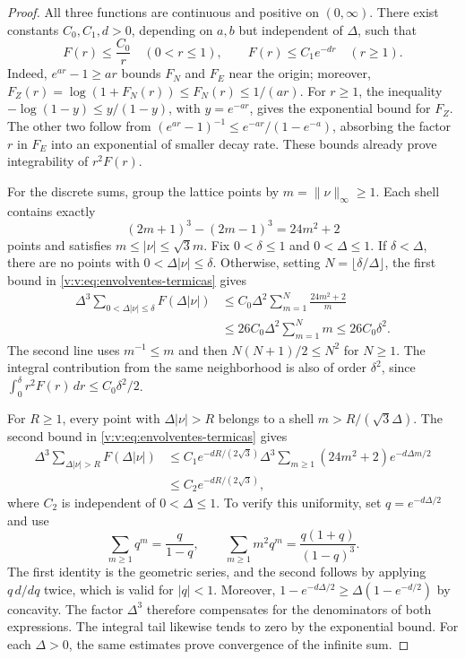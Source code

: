 \begin{proof}
All three functions are continuous and positive on \((0,\infty)\).
There exist constants \(C_0,C_1,d>0\), depending on \(a,b\) but
independent of \(\Delta\), such that
\begin{equation}
 F(r)\leq\frac{C_0}{r}\quad(0<r\leq1),\qquad
 F(r)\leq C_1e^{-dr}\quad(r\geq1).
 \label{v:v:eq:envolventes-termicas}
\end{equation}
Indeed, \(e^{ar}-1\geq ar\) bounds \(F_N\) and \(F_E\)
near the origin; moreover,
\(F_Z(r)=\log(1+F_N(r))\leq F_N(r)\leq1/(ar)\).
For \(r\geq1\), the inequality
\(-\log(1-y)\leq y/(1-y)\), with \(y=e^{-ar}\), gives the
exponential bound for \(F_Z\). The other two follow from
\((e^{ar}-1)^{-1}\leq e^{-ar}/(1-e^{-a})\), absorbing the
factor \(r\) in \(F_E\) into an exponential of smaller decay rate. These bounds
already prove integrability of \(r^2F(r)\).

For the discrete sums, group the lattice points by
\(m=\|\nu\|_\infty\geq1\). Each shell contains exactly
\[
 (2m+1)^3-(2m-1)^3=24m^2+2
\]
points and satisfies \(m\leq|\nu|\leq\sqrt3m\).
Fix \(0<\delta\leq1\) and \(0<\Delta\leq1\).
If \(\delta<\Delta\), there are no points with
\(0<\Delta|\nu|\leq\delta\). Otherwise, setting
\(N=\lfloor\delta/\Delta\rfloor\), the first bound in
\eqref{v:v:eq:envolventes-termicas} gives
\begin{align*}
 \Delta^3\!\sum_{0<\Delta|\nu|\leq\delta}F(\Delta|\nu|)
 &\leq C_0\Delta^2\sum_{m=1}^{N}\frac{24m^2+2}{m}\\
 &\leq26C_0\Delta^2\sum_{m=1}^{N}m
 \leq26C_0\delta^2.
\end{align*}
The second line uses \(m^{-1}\leq m\) and then
\(N(N+1)/2\leq N^2\) for \(N\geq1\).
The integral contribution from the same neighborhood is also of order
\(\delta^2\), since
\(\int_0^\delta r^2F(r)\,dr\leq C_0\delta^2/2\).

For \(R\geq1\), every point with \(\Delta|\nu|>R\) belongs
to a shell \(m>R/(\sqrt3\Delta)\). The second bound in
\eqref{v:v:eq:envolventes-termicas} gives
\begin{align*}
 \Delta^3\!\sum_{\Delta|\nu|>R}F(\Delta|\nu|)
 &\leq C_1e^{-dR/(2\sqrt3)}
 \Delta^3\sum_{m\geq1}(24m^2+2)e^{-d\Delta m/2}\\
 &\leq C_2e^{-dR/(2\sqrt3)},
\end{align*}
where \(C_2\) is independent of \(0<\Delta\leq1\). To verify
this uniformity, set \(q=e^{-d\Delta/2}\) and use
\[
 \sum_{m\geq1}q^m=\frac{q}{1-q},\qquad
 \sum_{m\geq1}m^2q^m=\frac{q(1+q)}{(1-q)^3}.
\]
The first identity is the geometric series, and the second follows by
applying \(q\,d/dq\) twice, which is valid for \(|q|<1\).
Moreover,
\(1-e^{-d\Delta/2}\geq\Delta(1-e^{-d/2})\) by concavity.
The factor \(\Delta^3\) therefore compensates for the denominators of
both expressions. The integral tail likewise tends to zero by the
exponential bound. For each \(\Delta>0\), the same estimates
prove convergence of the infinite sum.


\end{proof}
